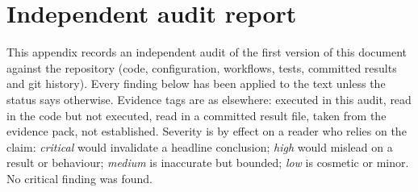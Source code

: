 \chapter{Independent audit report}\label{app:audit}
This appendix records an independent audit of the first version of this document against the repository (code, configuration, workflows, tests, committed results and git history). Every finding below has been applied to the text unless the status says otherwise. Evidence tags are as elsewhere: \evRUN{} executed in this audit, \evCODE{} read in the code but not executed, \evFILE{} read in a committed result file, \evPACK{} taken from the evidence pack, \evUNK{} not established. Severity is by effect on a reader who relies on the claim: \emph{critical} would invalidate a headline conclusion; \emph{high} would mislead on a result or behaviour; \emph{medium} is inaccurate but bounded; \emph{low} is cosmetic or minor. No critical finding was found.

